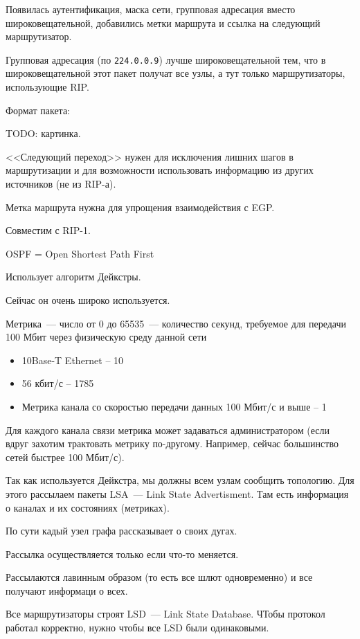 
Появилась аутентификация, маска сети, групповая адресация вместо широковещательной, добавились метки маршрута и ссылка на следующий маршрутизатор.

Групповая адресация (по {\tt 224.0.0.9}) лучше широковещательной тем, что в широковещательной этот пакет получат все узлы, а тут только маршрутизаторы, использующие RIP.

Формат пакета:

TODO: картинка.

<<Следующий переход>> нужен для исключения лишних шагов в маршрутизации и для возможности использовать информацию из других источников (не из RIP-а).

Метка маршрута нужна для упрощения взаимодействия с EGP.

Совместим с RIP-1.


OSPF = Open Shortest Path First

Использует алгоритм Дейкстры.

Сейчас он очень широко используется.

Метрика~--- число от 0 до 65535~--- количество секунд, требуемое для передачи 100 Мбит через физическую среду данной сети
\begin{itemize}
    \item 10Base-T Ethernet – 10
    \item 56 кбит/с – 1785
    \item Метрика канала со скоростью передачи данных 100 Мбит/с и выше – 1
\end{itemize}

Для каждого канала связи метрика может задаваться администратором (если вдруг захотим трактовать метрику по-другому. Например, сейчас большинство сетей быстрее 100 Мбит/с).

Так как используется Дейкстра, мы должны всем узлам сообщить топологию. Для этого рассылаем пакеты LSA~--- Link State Advertisment. Там есть информация о каналах и их состояниях (метриках).

По сути кадый узел графа рассказывает о своих дугах.

Рассылка осуществляется только если что-то меняется. 

Рассылаются лавинным образом (то есть все шлют одновременно) и все получают информаци о всех.

Все маршрутизаторы строят LSD~--- Link State Database. ЧТобы протокол работал корректно, нужно чтобы все LSD были одинаковыми.


